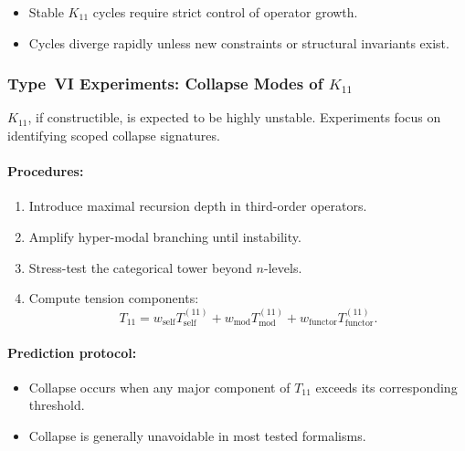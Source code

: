 \begin{itemize}
    \item Stable $K_{11}$ cycles require strict control of 
          operator growth.
    \item Cycles diverge rapidly unless new constraints or 
          structural invariants exist.
\end{itemize}



\subsubsection{Type~VI Experiments: Collapse Modes of $K_{11}$}

$K_{11}$, if constructible, is expected to be highly unstable.  
Experiments focus on identifying scoped collapse signatures.

\paragraph{Procedures:}

\begin{enumerate}
    \item Introduce maximal recursion depth in third-order operators.
    \item Amplify hyper-modal branching until instability.
    \item Stress-test the categorical tower beyond $n$-levels.
    \item Compute tension components:
          \[
              T_{11} =
                w_{\mathrm{self}} T_{\mathrm{self}}^{(11)}
              + w_{\mathrm{mod}} T_{\mathrm{mod}}^{(11)}
              + w_{\mathrm{functor}} T_{\mathrm{functor}}^{(11)}.
          \]
\end{enumerate}

\paragraph{Prediction protocol:}

\begin{itemize}
    \item Collapse occurs when any major component of $T_{11}$ exceeds 
          its corresponding threshold.
    \item Collapse is generally unavoidable in most tested formalisms.
\end{itemize}



